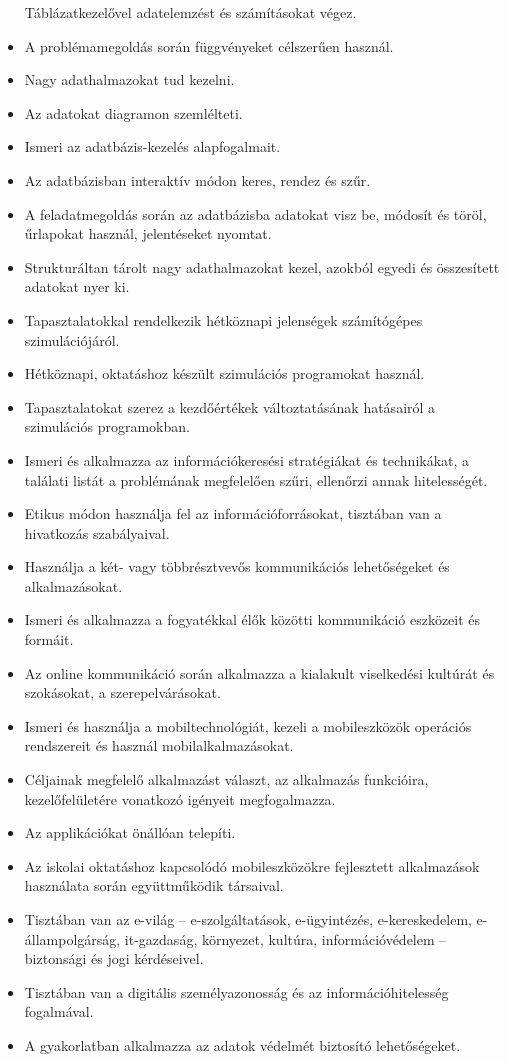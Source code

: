 \begin{itemize}
  Táblázatkezelővel adatelemzést és számításokat végez.
\item
  A problémamegoldás során függvényeket célszerűen használ.
\item
  Nagy adathalmazokat tud kezelni.
\item
  Az adatokat diagramon szemlélteti.
\item
  Ismeri az adatbázis-kezelés alapfogalmait.
\item
  Az adatbázisban interaktív módon keres, rendez és szűr.
\item
  A feladatmegoldás során az adatbázisba adatokat visz be, módosít és
  töröl, űrlapokat használ, jelentéseket nyomtat.
\item
  Strukturáltan tárolt nagy adathalmazokat kezel, azokból egyedi és
  összesített adatokat nyer ki.
\item
  Tapasztalatokkal rendelkezik hétköznapi jelenségek számítógépes
  szimulációjáról.
\item
  Hétköznapi, oktatáshoz készült szimulációs programokat használ.
\item
  Tapasztalatokat szerez a kezdőértékek változtatásának hatásairól a
  szimulációs programokban.
\item
  Ismeri és alkalmazza az információkeresési stratégiákat és
  technikákat, a találati listát a problémának megfelelően szűri,
  ellenőrzi annak hitelességét.
\item
  Etikus módon használja fel az információforrásokat, tisztában van a
  hivatkozás szabályaival.
\item
  Használja a két- vagy többrésztvevős kommunikációs lehetőségeket és
  alkalmazásokat.
\item
  Ismeri és alkalmazza a fogyatékkal élők közötti kommunikáció eszközeit
  és formáit.
\item
  Az online kommunikáció során alkalmazza a kialakult viselkedési
  kultúrát és szokásokat, a szerepelvárásokat.
\item
  Ismeri és használja a mobiltechnológiát, kezeli a mobileszközök
  operációs rendszereit és használ mobilalkalmazásokat.
\item
  Céljainak megfelelő alkalmazást választ, az alkalmazás funkcióira,
  kezelőfelületére vonatkozó igényeit megfogalmazza.
\item
  Az applikációkat önállóan telepíti.
\item
  Az iskolai oktatáshoz kapcsolódó mobileszközökre fejlesztett
  alkalmazások használata során együttműködik társaival.
\item
  Tisztában van az e-világ -- e-szolgáltatások, e-ügyintézés,
  e-kereskedelem, e-állampolgárság, it-gazdaság, környezet, kultúra,
  információvédelem -- biztonsági és jogi kérdéseivel.
\item
  Tisztában van a digitális személyazonosság és az információhitelesség
  fogalmával.
\item
  A gyakorlatban alkalmazza az adatok védelmét biztosító lehetőségeket.
\end{itemize}

